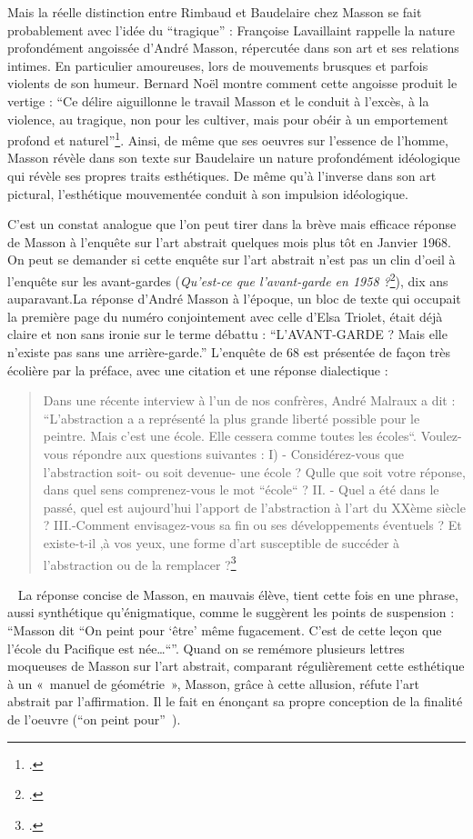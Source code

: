 	Mais la réelle distinction entre Rimbaud et Baudelaire chez Masson se fait probablement avec l’idée du \enquote{tragique} : Françoise Lavaillaint rappelle la nature profondément angoissée d’André Masson, répercutée dans son art et ses relations intimes. En particulier amoureuses, lors de mouvements brusques et parfois violents de son humeur. Bernard Noël montre comment cette angoisse produit le vertige : \enquote{Ce délire aiguillonne le travail Masson et le conduit à l’excès, à la violence, au tragique, non pour les cultiver, mais pour obéir à un emportement profond et naturel}\footcite[p83]{noel}.  Ainsi, de même que ses oeuvres sur l’essence de l’homme, Masson révèle dans son texte sur Baudelaire un nature profondément idéologique qui révèle ses propres traits esthétiques. De même qu’à l’inverse dans son art pictural, l’esthétique mouvementée conduit à son impulsion idéologique. 

C’est un constat analogue que l’on peut tirer dans la brève mais efficace réponse de Masson à l’enquête sur l’art abstrait quelques mois plus tôt en Janvier 1968. On peut se demander si cette enquête sur l’art abstrait n’est pas un clin d’oeil à l’enquête sur les avant-gardes (\emph{Qu’est-ce que l’avant-garde en 1958 ?}\footcite{avantgarde}), dix ans auparavant.La réponse d’André Masson à l’époque, un bloc de texte qui occupait la première page du numéro conjointement avec celle d’Elsa Triolet, était déjà claire et non sans ironie sur le terme débattu : \enquote{L’AVANT-GARDE ? Mais elle n’existe pas sans une arrière-garde.} L’enquête de 68 est présentée de façon très écolière par la préface, avec une citation et une réponse dialectique : 

\begin{quote}
Dans une récente interview à l’un de nos confrères, André Malraux a dit : “L’abstraction a a représenté la plus grande liberté possible pour le peintre. Mais c’est une école. Elle cessera comme toutes les écoles“. Voulez-vous répondre aux questions suivantes :  I) - Considérez-vous que l’abstraction soit- ou soit devenue- une école ? Qulle que soit votre réponse, dans quel sens comprenez-vous le mot “école“ ?  II. - Quel a  été dans le passé, quel est aujourd’hui l’apport de l’abstraction à l’art du XXème siècle ? III.-Comment envisagez-vous sa fin ou ses développements éventuels ? Et existe-t-il ,à vos yeux, une forme d’art susceptible de succéder à l’abstraction ou de la remplacer ?\footcite{avantgarde}
\end{quote}
 
	 La réponse concise de Masson, en mauvais élève, tient cette fois en une phrase, aussi synthétique qu’énigmatique, comme le suggèrent les points de suspension : \enquote{Masson dit “On peint pour \enquote{être} même fugacement. C’est de cette leçon que l’école du Pacifique est née…“}. Quand on se remémore plusieurs lettres moqueuses de Masson sur l’art abstrait, comparant régulièrement cette esthétique à un « manuel de géométrie », Masson, grâce à cette allusion, réfute l’art abstrait par l’affirmation. Il le fait en énonçant sa propre conception de la finalité de l’oeuvre (\enquote{on peint pour} ). 

